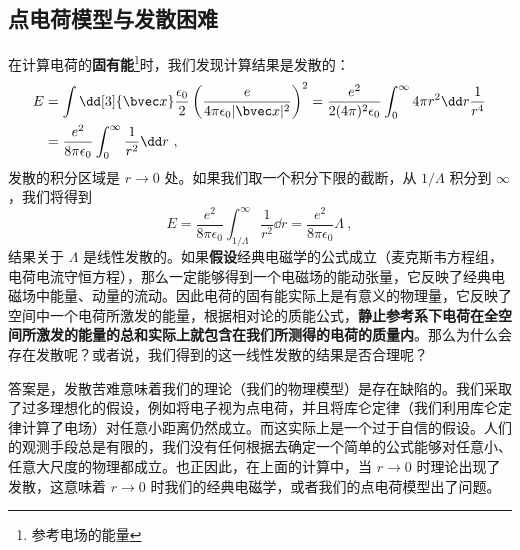 
\subsection{点电荷模型与发散困难}
在计算电荷的\textbf{固有能}\footnote{参考电场的能量}时，我们发现计算结果是发散的：
\begin{equation}\label{eq_elecdb_1}
\begin{aligned}
E&=\int \dd[3]{\bvec x}\frac{\epsilon_0}{2} \left(\frac{e}{4\pi\epsilon_0 |\bvec x|^2}\right)^2=\frac{e^2}{2(4\pi)^2\epsilon_0}\int_0^\infty 4\pi r^2\dd r \frac{1}{r^4}\\
&=\frac{e^2}{8\pi\epsilon_0} \int_0^\infty \frac{1}{r^2}\dd r~,
\end{aligned}
\end{equation}
发散的积分区域是 $r\rightarrow 0$ 处。如果我们取一个积分下限的截断，从 $1/\Lambda$ 积分到 $\infty$，我们将得到
\begin{equation}
E=\frac{e^2}{8\pi\epsilon_0}\int_{1/\Lambda}^{\infty} \frac{1}{r^2}\dd r=\frac{e^2}{8\pi\epsilon_0}\Lambda~,
\end{equation}
结果关于 $\Lambda$ 是线性发散的。如果\textbf{假设}经典电磁学的公式成立（麦克斯韦方程组，电荷电流守恒方程），那么一定能够得到一个电磁场的能动张量，它反映了经典电磁场中能量、动量的流动。因此电荷的固有能实际上是有意义的物理量，它反映了空间中一个电荷所激发的能量，根据相对论的质能公式，\textbf{静止参考系下电荷在全空间所激发的能量的总和实际上就包含在我们所测得的电荷的质量内}。那么为什么会存在发散呢？或者说，我们得到的这一线性发散的结果是否合理呢？

答案是，发散苦难意味着我们的理论（我们的物理模型）是存在缺陷的。我们采取了过多理想化的假设，例如将电子视为点电荷，并且将库仑定律（我们利用库仑定律计算了电场）对任意小距离仍然成立。而这实际上是一个过于自信的假设。人们的观测手段总是有限的，我们没有任何根据去确定一个简单的公式能够对任意小、任意大尺度的物理都成立。也正因此，在上面的计算中，当 $r\rightarrow 0$ 时理论出现了发散，这意味着 $r\rightarrow 0$ 时我们的经典电磁学，或者我们的点电荷模型出了问题。

